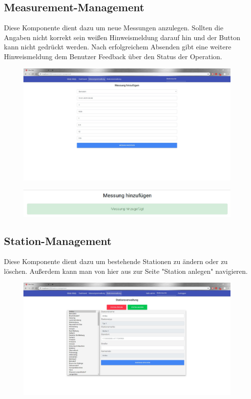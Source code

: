 \documentclass[10pt,a4paper,margin=0pt]{scrartcl}
\begin{document}
\subsection{Measurement-Management}
Diese Komponente dient dazu um neue Messungen anzulegen. Sollten die Angaben nicht korrekt sein weißen Hinweismeldung darauf hin und der Button kann nicht gedrückt werden. Nach erfolgreichem Absenden gibt eine weitere Hinweismeldung dem Benutzer Feedback über den Status der Operation.
\begin{figure}[H]
\includegraphics[width=\textwidth]{./img/messung.jpg}
\centering
\end{figure}
\begin{figure}[H]
\includegraphics[width=\textwidth]{./img/messung1.jpg}
\centering
\end{figure}
\pagebreak
\subsection{Station-Management}
Diese Komponente dient dazu um bestehende Stationen zu ändern oder zu löschen. Außerdem kann man von hier aus zur Seite "Station anlegen" navigieren.
\begin{figure}[H]
\includegraphics[width=\textwidth]{./img/station-management.jpg}
\centering
\end{figure}
\end{document}
